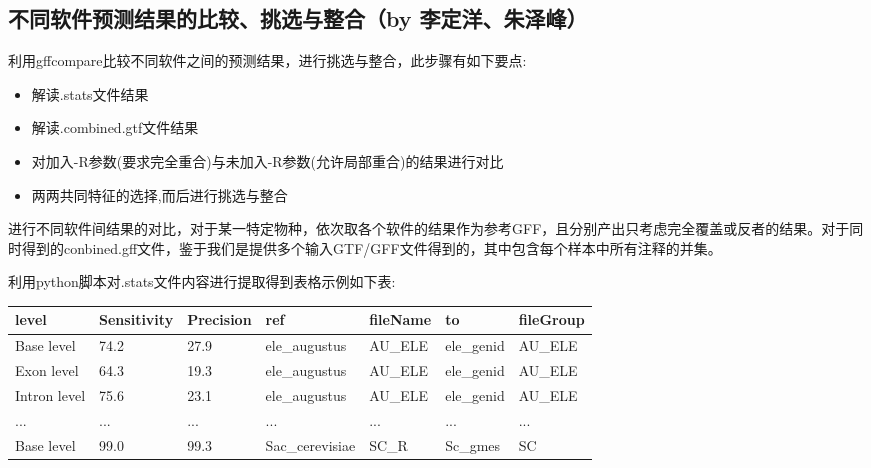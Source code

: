 \documentclass[12pt]{ctexart}
\begin{document}
\subsection{不同软件预测结果的比较、挑选与整合（by 李定洋、朱泽峰）}

利用gffcompare比较不同软件之间的预测结果，进行挑选与整合，此步骤有如下要点:

\begin{itemize}
    \item 解读.stats文件结果
    \item 解读.combined.gtf文件结果
    \item 对加入-R参数(要求完全重合)与未加入-R参数(允许局部重合)的结果进行对比
    \item 两两共同特征的选择,而后进行挑选与整合
\end{itemize}

进行不同软件间结果的对比，对于某一特定物种，依次取各个软件的结果作为参考GFF，且分别产出只考虑完全覆盖或反者的结果。对于同时得到的conbined.gff文件，鉴于我们是提供多个输入GTF/GFF文件得到的，其中包含每个样本中所有注释的并集。\citep{pmid32489650}

利用python脚本对.stats文件内容进行提取得到表格示例如下表:

\begin{minipage}{\linewidth}
\centering
{} \label{tab:title} 
\begin{tabular}{ C{0.55in} *6{C{0.75in}}}\toprule[1.5pt]
\textbf{level} & \textbf{Sensitivity} & \textbf{Precision} & \textbf{ref}               & \textbf{fileName} & \textbf{to}              & \textbf{fileGroup} \\ \hline
Base level     & 74.2                 & 27.9               & ele\_augustus & AU\_ELE     & ele\_genid & AU\_ELE            \\
Exon level     & 64.3                 & 19.3               & ele\_augustus & AU\_ELE     & ele\_genid & AU\_ELE            \\
Intron level   & 75.6                 & 23.1               & ele\_augustus & AU\_ELE     & ele\_genid & AU\_ELE            \\
...            & ...                  & ...                & ...                        & ...               & ...                      & ...                \\
Base level     & 99.0                 & 99.3               & Sac\_cerevisiae        & SC\_R       & Sc\_gmes            & SC                 \\
\bottomrule[1.25pt]
\end {tabular}\par
\bigskip
\end{minipage}
\end{document}

